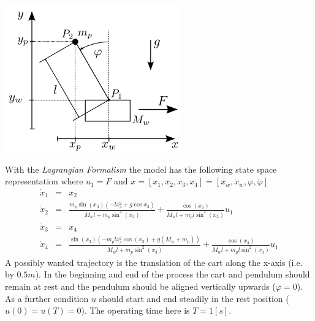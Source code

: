 \documentclass[letterpaper,10pt,english]{sphinxmanual}
\begin{document}
\includegraphics{inv_pendulum.png}

With the \emph{Lagrangian Formalism} the model has the following state space
representation where \(u_1 = F\) and
\(x = [x_1, x_2, x_3, x_4] = [x_w, \dot{x}_w, \varphi, \dot{\varphi}]\)
\begin{eqnarray*}
   \dot{x}_1 & = & x_2 \\
   \dot{x}_2 & = & \frac{m_p \sin(x_3)(-l x_4^2 + g \cos x_3)}{M_w l + m_p \sin^2(x_3)} + \frac{\cos(x_3)}{M_w l + m_p l \sin^2(x_3)} u_1 \\
   \dot{x}_3 & = & x_4 \\
   \dot{x}_4 & = & \frac{\sin(x_3)(-m_p l x_4^2 \cos(x_3) + g(M_w + m_p))}{M_w l + m_p \sin^2(x_3)} + \frac{\cos(x_3)}{M_w l + m_p l \sin^2(x_3)} u_1
\end{eqnarray*}
A possibly wanted trajectory is the translation of the cart along the
x-axis (i.e. by \(0.5m\)). In the beginning and end of the process
the cart and pendulum should remain at rest and the pendulum should be
aligned vertically upwards (\(\varphi = 0\)). As a further condition
\(u\) should start and end steadily in the rest position
(\(u(0) = u(T) = 0\)).
The operating time here is \(T = 1 [s]\).
\end{document}
